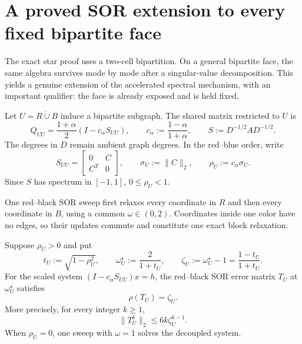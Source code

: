 \section{A proved SOR extension to every fixed bipartite face}
\label{sec:fixed-face-sor}

The exact star proof uses a two-cell bipartition.  On a general bipartite
face, the same algebra survives mode by mode after a singular-value
decomposition.  This yields a genuine extension of the accelerated spectral
mechanism, with an important qualifier: the face is already exposed and is
held fixed.

Let $U=R\mathbin{\dot\cup}B$ induce a bipartite subgraph.  The shared matrix
restricted to $U$ is
\begin{equation}
 Q_{UU}=\frac{1+\alpha}{2}
 \left(I-c_\alpha S_{UU}\right),
 \qquad
 c_\alpha:=\frac{1-\alpha}{1+\alpha},
 \qquad
 S:=D^{-1/2}AD^{-1/2}.
 \label{eq:scaled-fixed-face}
\end{equation}
The degrees in $D$ remain ambient graph degrees.  In the red--blue order,
write
\begin{equation}
 S_{UU}=\begin{bmatrix}0&C\\C^T&0\end{bmatrix},
 \qquad
 \sigma_U:=\|C\|_2,
 \qquad
 \rho_U:=c_\alpha\sigma_U.
 \label{eq:bipartite-cross-block}
\end{equation}
Since $S$ has spectrum in $[-1,1]$, $0\leq\rho_U<1$.

One red--black SOR sweep first relaxes every coordinate in $R$ and then every
coordinate in $B$, using a common $\omega\in(0,2)$.  Coordinates inside one
color have no edges, so their updates commute and constitute one exact block
relaxation.

\begin{theorem}
\label{thm:fixed-bipartite-sor}
Suppose $\rho_U>0$ and put
\begin{equation}
 t_U:=\sqrt{1-\rho_U^2},
 \qquad
 \omega_U^\star:=\frac{2}{1+t_U},
 \qquad
 \zeta_U:=\omega_U^\star-1
 =\frac{1-t_U}{1+t_U}.
 \label{eq:fixed-face-optimal-sor}
\end{equation}
For the scaled system $(I-c_\alpha S_{UU})x=h$, the red--black SOR error
matrix $T_U$ at $\omega_U^\star$ satisfies
\begin{equation}
 \rho(T_U)=\zeta_U.
 \label{eq:fixed-face-spectral-radius}
\end{equation}
More precisely, for every integer $k\geq1$,
\begin{equation}
 \|T_U^k\|_2\leq6k\zeta_U^{k-1}.
 \label{eq:fixed-face-power-bound}
\end{equation}
When $\rho_U=0$, one sweep with $\omega=1$ solves the decoupled system.
\end{theorem}

